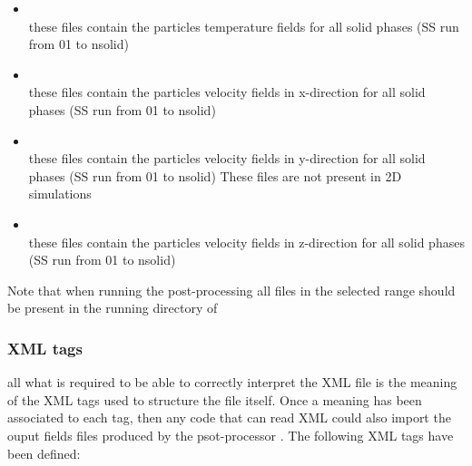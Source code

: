 \begin{itemize}
\item {} \\
      these files contain the particles temperature fields
      for all solid phases (SS run from 01 to nsolid)

\item {} \\
      these files contain the particles velocity fields in x-direction
      for all solid phases (SS run from 01 to nsolid)

\item {} \\
      these files contain the particles velocity fields in y-direction
      for all solid phases (SS run from 01 to nsolid)
      These files are not present in 2D simulations

\item {} \\
      these files contain the particles velocity fields in z-direction
      for all solid phases (SS run from 01 to nsolid)

\end{itemize}

Note that when running the post-processing all 
 files in the selected range should 
be present in the running directory of 

\subsubsection{XML tags}

all what is required to be able to correctly interpret the XML file
is the meaning of the XML tags used to structure the file itself.
Once a meaning has been associated to each tag, then any code
that can read XML could also import the ouput fields files 
produced by the psot-processor  .
The following XML tags have been defined:

